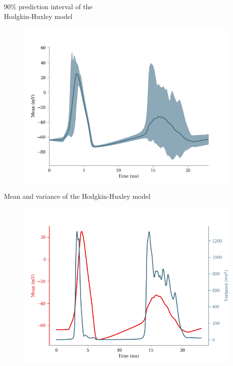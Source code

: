 \documentclass[presentation]{beamer}
\begin{document}
\begin{frame}{90\% prediction interval of the \\ Hodgkin-Huxley model}
  \vspace{-5mm}
  \begin{figure}
    \includegraphics[width=1\textwidth]{hh_prediction.png}
  \end{figure}

\end{frame}




\begin{frame}{Mean and variance of the Hodgkin-Huxley model}
  \vspace{-5mm}
  \begin{figure}
    \includegraphics[width=1\textwidth]{hh_mean.png}
  \end{figure}

\end{frame}
\end{document}
